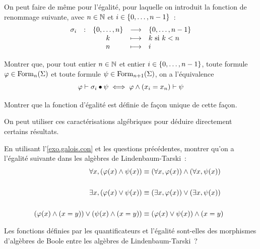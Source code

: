 \begin{problem}
  On peut faire de même pour l'égalité, pour laquelle on introduit la fonction
  de renommage suivante, avec $n \in \mathbb N$ et $i\in\{0,\ldots,n - 1\}$~:
  \[
  \makeFunBis{\sigma_{i}}{\intervP{0}{n}}{\intervInt{n}}
             {k}{k\text{ si } k < n}
             {n}{i}
  \]
  \begin{pbQuest}[resume]
  \item Montrer que, pour tout entier $n \in \mathbb N$ et entier $i\in\{0,\ldots,n - 1\}$,
    toute formule $\varphi\in\operatorname{Form}_{n}(\Sigma)$ et toute formule
    $\psi\in\operatorname{Form}_{n+1}(\Sigma)$, on a l'équivalence
    \[\varphi\vdash\sigma_{i}\mathbin{\bullet}\psi \iff \varphi\land(x_i = x_n)\vdash\psi\]
  \item Montrer que la fonction d'égalité est définie de façon unique de cette
    façon.
  \end{pbQuest}

  On peut utiliser ces caractérisations algébriques pour déduire directement
  certains résultats.
  \begin{pbQuest}[resume]
  \item En utilisant l'\cref{exo.galois.con} et les questions précédentes,
    montrer qu'on a l'égalité suivante dans les algèbres de Lindenbaum-Tarski~:
    \begin{align*}
      \forall x, (\varphi(x)\land\psi(x)) &\equiv
      (\forall x, \varphi(x))\land(\forall x, \psi(x))\quad\\ \\
      \exists x, (\varphi(x)\lor\psi(x)) &\equiv
      (\exists x, \varphi(x))\lor(\exists x, \psi(x))\\ \\
      (\varphi(x) \land (x = y))\lor(\psi(x) \land (x = y)) &\equiv
      (\varphi(x)\lor \psi(x))\land (x = y)
    \end{align*}
  \item Les fonctions définies par les quantificateurs et l'égalité sont-elles
    des morphismes d'algèbres de Boole entre les algèbres de Lindenbaum-Tarski~?
  \end{pbQuest}



\end{problem}
